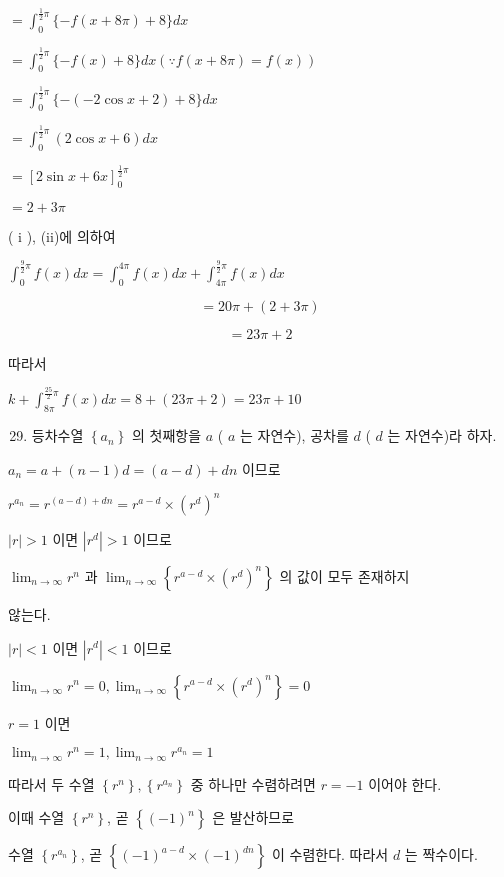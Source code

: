 \documentclass[10pt]{article}
\begin{document}
$=\int_{0}^{\frac{1}{2} \pi}\{-f(x+8 \pi)+8\} d x$

$=\int_{0}^{\frac{1}{2} \pi}\{-f(x)+8\} d x(\because f(x+8 \pi)=f(x))$

$=\int_{0}^{\frac{1}{2} \pi}\{-(-2 \cos x+2)+8\} d x$

$=\int_{0}^{\frac{1}{2} \pi}(2 \cos x+6) d x$

$=[2 \sin x+6 x]_{0}^{\frac{1}{2} \pi}$

$=2+3 \pi$

( i ), (ii)에 의하여

$\int_{0}^{\frac{9}{2} \pi} f(x) d x=\int_{0}^{4 \pi} f(x) d x+\int_{4 \pi}^{\frac{9}{2} \pi} f(x) d x$

\[
=20 \pi+(2+3 \pi)
\]

\[
=23 \pi+2
\]

따라서

$k+\int_{8 \pi}^{\frac{25}{2} \pi} f(x) d x=8+(23 \pi+2)=23 \pi+10$

\begin{enumerate}
  \setcounter{enumi}{28}
  \item 등차수열 $\left\{a_{n}\right\}$ 의 첫째항을 $a$ ( $a$ 는 자연수), 공차를 $d$ ( $d$ 는 자연수)라 하자.
\end{enumerate}

$a_{n}=a+(n-1) d=(a-d)+d n$ 이므로

$r^{a_{n}}=r^{(a-d)+d n}=r^{a-d} \times\left(r^{d}\right)^{n}$

$|r|>1$ 이면 $\left|r^{d}\right|>1$ 이므로

$\lim _{n \rightarrow \infty} r^{n}$ 과 $\lim _{n \rightarrow \infty}\left\{r^{a-d} \times\left(r^{d}\right)^{n}\right\}$ 의 값이 모두 존재하지

않는다.

$|r|<1$ 이면 $\left|r^{d}\right|<1$ 이므로

$\lim _{n \rightarrow \infty} r^{n}=0, \lim _{n \rightarrow \infty}\left\{r^{a-d} \times\left(r^{d}\right)^{n}\right\}=0$

$r=1$ 이면

$\lim _{n \rightarrow \infty} r^{n}=1, \lim _{n \rightarrow \infty} r^{a_{n}}=1$

따라서 두 수열 $\left\{r^{n}\right\},\left\{r^{a_{n}}\right\}$ 중 하나만 수렴하려면 $r=-1$ 이어야 한다.

이때 수열 $\left\{r^{n}\right\}$, 곧 $\left\{(-1)^{n}\right\}$ 은 발산하므로

수열 $\left\{r^{a_{n}}\right\}$, 곧 $\left\{(-1)^{a-d} \times(-1)^{d n}\right\}$ 이 수렴한다. 따라서 $d$ 는 짝수이다.
\end{document}
